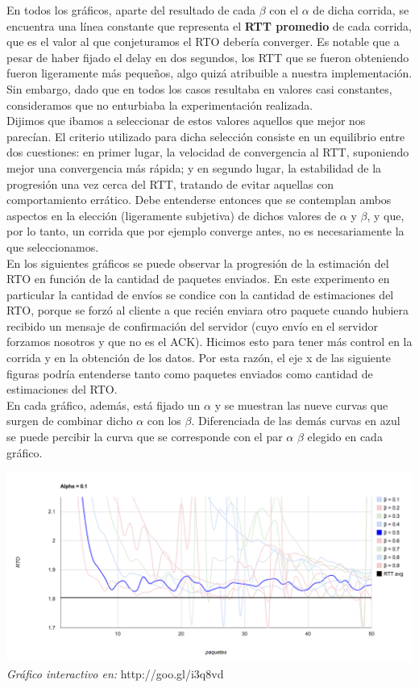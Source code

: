 \indent En todos los gráficos, aparte del resultado de cada $\beta$ con el $\alpha$ de dicha corrida, se encuentra una línea constante que representa el \textbf{RTT promedio} de cada corrida, que es el valor al que conjeturamos el RTO debería converger. Es notable que a pesar de haber fijado el delay en dos segundos, los RTT que se fueron obteniendo fueron ligeramente más pequeños, algo quizá atribuible a nuestra implementación. Sin embargo, dado que en todos los casos resultaba en valores casi constantes, consideramos que no enturbiaba la experimentación realizada.\\
\indent Dijimos que ibamos a seleccionar de estos valores aquellos que mejor nos parecían. El criterio utilizado para dicha selección consiste en un equilibrio entre dos cuestiones: en primer lugar, la velocidad de convergencia al RTT, suponiendo mejor una convergencia más rápida; y en segundo lugar, la estabilidad de la progresión una vez cerca del RTT, tratando de evitar aquellas con comportamiento errático. Debe entenderse entonces que se contemplan ambos aspectos en la elección (ligeramente subjetiva) de dichos valores de $\alpha$ y $\beta$, y que, por lo tanto, un corrida que por ejemplo converge antes, no es necesariamente la que seleccionamos.\\
\indent En los siguientes gráficos se puede observar la progresión de la estimación del RTO en función de la cantidad de paquetes enviados. En este experimento en particular la cantidad de envíos se condice con la cantidad de estimaciones del RTO, porque se forzó al cliente a que recién enviara otro paquete cuando hubiera recibido un mensaje de confirmación del servidor (cuyo envío en el servidor forzamos nosotros y que no es el ACK). Hicimos esto para tener más control en la corrida y en la obtención de los datos. Por esta razón, el eje x de las siguiente figuras podría entenderse tanto como paquetes enviados como cantidad de estimaciones del RTO.\\
\indent En cada gráfico, además, está fijado un $\alpha$ y se muestran las nueve curvas que surgen de combinar dicho $\alpha$ con los $\beta$. Diferenciada de las demás curvas en azul se puede percibir la curva que se corresponde con el par $\alpha$ $\beta$ elegido en cada gráfico.\\
\begin{center}
	\includegraphics[scale=0.35]{graphics/rto_vs_paquetes_a_1.png}
	\textit{Gráfico interactivo en:} http://goo.gl/i3q8vd
\end{center}

